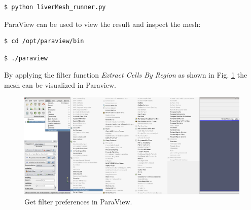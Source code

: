 \begin{lstlisting}[language=sh, breaklines=true]
$ python liverMesh_runner.py
\end{lstlisting}

ParaView can be used to view the result and inspect the mesh:
\begin{lstlisting}[language=sh, breaklines=true]
$ cd /opt/paraview/bin
\end{lstlisting}
\begin{lstlisting}[language=sh, breaklines=true]
$ ./paraview
\end{lstlisting}

By applying the filter function \emph{Extract Cells By Region} as shown in Fig. \ref{ParaviewFilterScreenshot} the mesh can be visualized in Paraview. 

\begin{figure}[h]
  	\centering
    \includegraphics[width=\textwidth]{pictures/paraview_filter.png}
    \caption{Get filter preferences in ParaView.}
    \label{ParaviewFilterScreenshot}
\end{figure}


